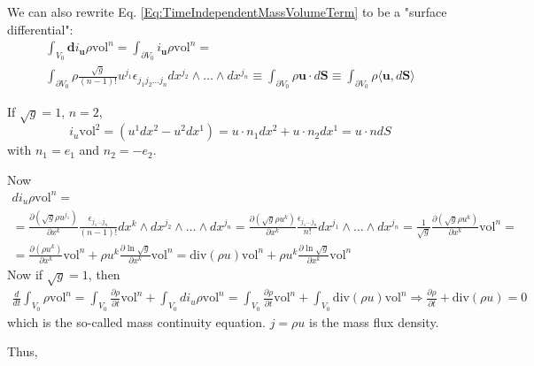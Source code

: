 \documentclass[10pt]{amsart}
\begin{document}
\begin{multicols*}{2}
We can also rewrite Eq. \ref{Eq:TimeIndependentMassVolumeTerm} to be a "surface differential":
\begin{equation}
\begin{gathered}
\int_{V_0} \mathbf{d}i_{\mathbf{u}} \rho \text{vol}^n = \int_{\partial V_0} i_{\mathbf{u}} \rho \text{vol}^n = \\
\int_{\partial V_0} \rho \frac{ \sqrt{g}}{ (n-1)!} u^{j_1} \epsilon_{j_1 j_2 \dots j_n} dx^{j_2} \wedge \dots \wedge dx^{j_n} \equiv \int_{\partial V_0} \rho \mathbf{u} \cdot d\mathbf{S} \equiv \int_{\partial V_0} \rho \langle \mathbf{u}, d\mathbf{S} \rangle 
\end{gathered}
\end{equation}


If $\sqrt{g} = 1$, $n=2$, 
\[
i_u \text{vol}^2 = (u^1 dx^2 - u^2 dx^1) = u\cdot n_1 dx^2 + u\cdot n_2 dx^1 = u\cdot n dS
\]
with $n_1 =e_1$ and $n_2=-e_2$.  

Now 
\[
\begin{gathered}
di_u \rho \text{vol}^n = \\
= \frac{ \partial ( \sqrt{g} \rho u^{j_1} ) }{ \partial x^k} \frac{ \epsilon_{j_1 \dots j_n} }{ (n-1)! } dx^k \wedge dx^{j_2} \wedge \dots \wedge dx^{j_n} = \frac{ \partial (\sqrt{ g} \rho u^k) }{ \partial x^k} \frac{ \epsilon_{j_1 \dots j_n }}{ n!} dx^{j_1} \wedge \dots \wedge dx^{j_n} = \frac{1}{\sqrt{g}} \frac{ \partial (\sqrt{g} \rho u^k)}{ \partial x^k} \text{vol}^n = \\
= \frac{ \partial (\rho u^k)}{ \partial x^k} \text{vol}^n + \rho u^k \frac{ \partial \ln{ \sqrt{g}}}{ \partial x^k} \text{vol}^n = \text{div}(\rho u) \text{vol}^n + \rho u^k \frac{ \partial \ln{ \sqrt{g}}}{ \partial x^k} \text{vol}^n
\end{gathered}
\]
Now if $\sqrt{g}=1$, then 
\[
\begin{gathered}
\frac{d}{dt} \int_{V_0} \rho \text{vol}^n = \int_{V_0} \frac{ \partial \rho }{ \partial t} \text{vol}^n + \int_{V_0} di_u \rho \text{vol}^n = \int_{V_0} \frac{ \partial \rho }{ \partial t} \text{vol}^n + \int_{V_0} \text{div}(\rho u) \text{vol}^n \Longrightarrow \frac{ \partial \rho}{\partial t} + \text{div}(\rho u) = 0
\end{gathered}
\]
which is the so-called mass continuity equation.  $ j = \rho u$ is the mass flux density.  

Thus,


\end{multicols*}
\end{document}
